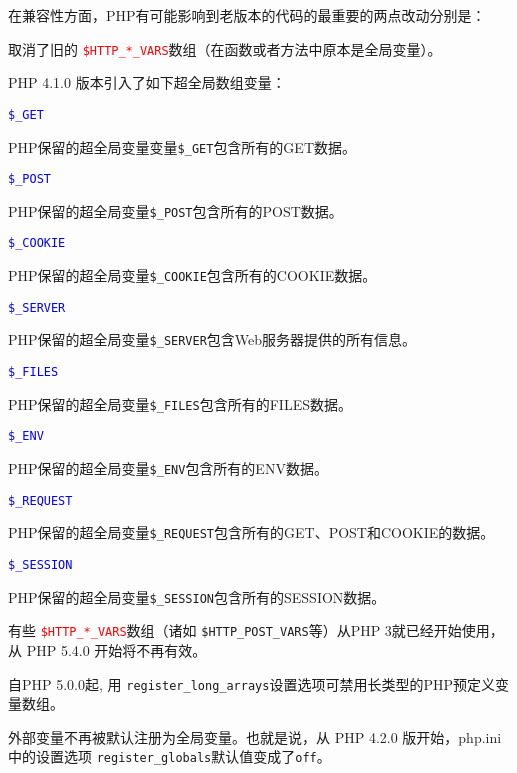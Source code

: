 在兼容性方面，PHP有可能影响到老版本的代码的最重要的两点改动分别是：

\begin{compactitem}
\item 取消了旧的 \textcolor{red}{\texttt{\$HTTP\_*\_VARS}}数组（在函数或者方法中原本是全局变量）。

\end{compactitem}

PHP 4.1.0 版本引入了如下超全局数组变量：

\begin{compactitem}
\item \textcolor{blue}{\texttt{\$\_GET}}

PHP保留的超全局变量变量\texttt{\$\_GET}包含所有的GET数据。
\item \textcolor{blue}{\texttt{\$\_POST}}

PHP保留的超全局变量\texttt{\$\_POST}包含所有的POST数据。
\item \textcolor{blue}{\texttt{\$\_COOKIE}}

PHP保留的超全局变量\texttt{\$\_COOKIE}包含所有的COOKIE数据。
\item \textcolor{blue}{\texttt{\$\_SERVER}}

PHP保留的超全局变量\texttt{\$\_SERVER}包含Web服务器提供的所有信息。

\item \textcolor{blue}{\texttt{\$\_FILES}}

PHP保留的超全局变量\texttt{\$\_FILES}包含所有的FILES数据。
\item \textcolor{blue}{\texttt{\$\_ENV}}

PHP保留的超全局变量\texttt{\$\_ENV}包含所有的ENV数据。
\item \textcolor{blue}{\texttt{\$\_REQUEST}}

PHP保留的超全局变量\texttt{\$\_REQUEST}包含所有的GET、POST和COOKIE的数据。
\item \textcolor{blue}{\texttt{\$\_SESSION}}

PHP保留的超全局变量\texttt{\$\_SESSION}包含所有的SESSION数据。
\end{compactitem}

有些 \textcolor{red}{\texttt{\$HTTP\_*\_VARS}}数组（诸如 \texttt{\$HTTP\_POST\_VARS}等）从PHP 3就已经开始使用，从 PHP 5.4.0 开始将不再有效。


自PHP 5.0.0起, 用 \texttt{register\_long\_arrays}设置选项可禁用长类型的PHP预定义变量数组。


\begin{compactitem}
\item 外部变量不再被默认注册为全局变量。也就是说，从 PHP 4.2.0 版开始，php.ini 中的设置选项 \texttt{register\_globals}默认值变成了\texttt{off}。

\end{compactitem}

